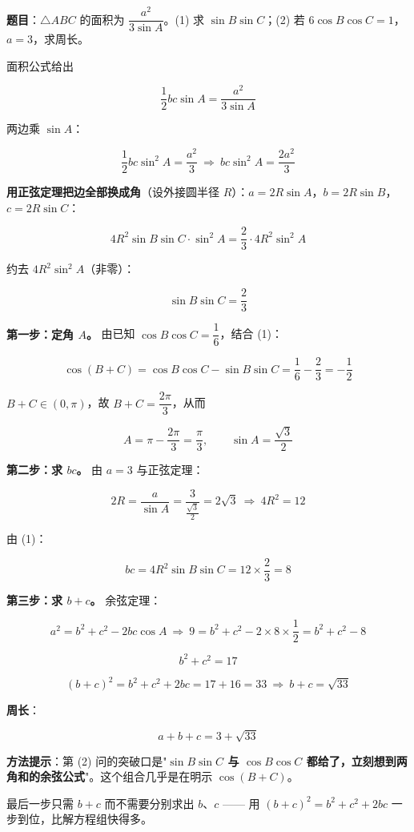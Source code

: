 \textbf{题目}：$\triangle ABC$ 的面积为 $\dfrac{a^{2}}{3\sin A}$。(1) 求 $\sin B\sin C$；(2) 若 $6\cos B\cos C=1$，$a=3$，求周长。


面积公式给出

\[\frac12bc\sin A=\frac{a^{2}}{3\sin A}\]

两边乘 $\sin A$：

\[\frac12bc\sin^{2}A=\frac{a^{2}}3\ \Longrightarrow\ bc\sin^{2}A=\frac{2a^{2}}3\]

\textbf{用正弦定理把边全部换成角}（设外接圆半径 $R$）：$a=2R\sin A$，$b=2R\sin B$，$c=2R\sin C$：

\[4R^{2}\sin B\sin C\cdot\sin^{2}A=\frac23\cdot4R^{2}\sin^{2}A\]

约去 $4R^{2}\sin^{2}A$（非零）：

\[\sin B\sin C=\frac23\]


\textbf{第一步：定角 $A$。} 由已知 $\cos B\cos C=\dfrac16$，结合 (1)：

\[\cos(B+C)=\cos B\cos C-\sin B\sin C=\frac16-\frac23=-\frac12\]

$B+C\in(0,\pi)$，故 $B+C=\dfrac{2\pi}3$，从而

\[A=\pi-\frac{2\pi}3=\frac\pi3,\qquad \sin A=\frac{\sqrt3}2\]

\textbf{第二步：求 $bc$。} 由 $a=3$ 与正弦定理：

\[2R=\frac a{\sin A}=\frac3{\frac{\sqrt3}2}=2\sqrt3\ \Longrightarrow\ 4R^{2}=12\]

由 (1)：

\[bc=4R^{2}\sin B\sin C=12\times\frac23=8\]

\textbf{第三步：求 $b+c$。} 余弦定理：

\[a^{2}=b^{2}+c^{2}-2bc\cos A\ \Longrightarrow\ 9=b^{2}+c^{2}-2\times8\times\frac12=b^{2}+c^{2}-8\]

\[b^{2}+c^{2}=17\]

\[(b+c)^{2}=b^{2}+c^{2}+2bc=17+16=33\ \Longrightarrow\ b+c=\sqrt{33}\]

\textbf{周长}：

\[a+b+c=3+\sqrt{33}\]

\begin{gktip}
\textbf{方法提示}：第 (2) 问的突破口是"\textbf{$\sin B\sin C$ 与 $\cos B\cos C$ 都给了，立刻想到两角和的余弦公式}"。这个组合几乎是在明示 $\cos(B+C)$。

最后一步只需 $b+c$ 而不需要分别求出 $b$、$c$ —— 用 $(b+c)^{2}=b^{2}+c^{2}+2bc$ 一步到位，比解方程组快得多。
\end{gktip}

